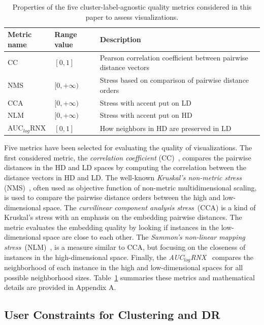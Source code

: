 \begin{table}%
\caption{Properties of the five cluster-label-agnostic quality metrics considered in this paper to assess visualizations.}\label{tab:metrics}
\begin{tabular}{p{1.5cm} p{0.8cm} p{4.5cm}}
\toprule
Metric name &  Range value & Description\\
\midrule
CC & $[0, 1]$ & Pearson correlation coefficient between pairwise distance vectors\\
NMS & $[0, +\infty)$ & Stress based on comparison of pairwise distance orders\\
CCA & $[0, +\infty)$ & Stress with accent put on LD\\
NLM & $[0, +\infty)$ & Stress with accent put on HD\\
AUC$_{log}$RNX & $[0, 1]$ & How neighbors in HD are preserved in LD\\
\bottomrule
\end{tabular}
\end{table}

Five metrics have been selected for evaluating the quality of visualizations. 
The first considered metric, the \emph{correlation coefficient} (CC)~\cite{geng2005}, compares the pairwise distances in the HD and LD spaces by computing the correlation between the distance vectors in HD and LD. The well-known \emph{Kruskal's non-metric stress} (NMS)~\cite{kruskal1964}, often used as objective function of non-metric multidimensional scaling, is used to compare the pairwise distance orders between the high and low-dimensional space. The \emph{curvilinear component analysis stress}~(CCA) \cite{demartines1997} is a kind of Kruskal's stress with an emphasis on the embedding pairwise distances. The metric evaluates the embedding quality by looking if instances in the low-dimensional space are close to each other. The \emph{Sammon's non-linear mapping stress}~(NLM)~\cite{sammon1969}, is a measure similar to CCA, but focusing on the closeness of instances in the high-dimensional space. Finally, the \emph{AUC$_{log}$RNX}~\cite{lee2015} compares the neighborhood of each instance in the high and low-dimensional spaces for all possible neighborhood sizes. Table~\ref{tab:metrics} summaries these metrics and mathematical details are provided in Appendix A. 

\subsection{User Constraints for Clustering and DR}\label{subsec:user_constraints_clustering_DR}

